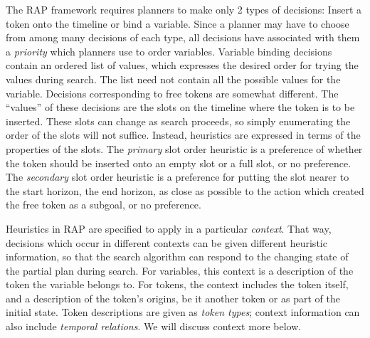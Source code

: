 The RAP framework requires planners to make only 2 types of decisions:
Insert a token onto the timeline or bind a variable.  Since a planner
may have to choose from among many decisions of each type, all
decisions have associated with them a {\em priority} which planners use
to order variables.  Variable binding decisions contain an ordered
list of values, which expresses the desired order for trying the
values during search.  The list need not contain all the possible
values for the variable.  Decisions corresponding to free tokens
are somewhat different.  The ``values'' of these decisions are the
slots on the timeline where the token is to be inserted.  These slots
can change as search proceeds, so simply enumerating the order of the
slots will not suffice.  Instead, heuristics are expressed in terms of the
properties of the slots.  The {\em primary} slot order heuristic is a
preference of whether the token should be inserted onto an empty slot
or a full slot, or no preference.  The {\em secondary} slot order heuristic
is a preference for putting the slot nearer to the start horizon, the end
horizon, as close as possible to the action which created the free token
as a subgoal, or no preference.  


Heuristics in RAP are specified to apply in a particular {\em
context}.  That way, decisions which occur in different contexts can
be given different heuristic information, so that the search algorithm
can respond to the changing state of the partial plan during search.
For variables, this context is a description of the token the variable
belongs to.  For tokens, the context includes the token itself, and a
description of the token's origins, be it another token or as part of
the initial state.  Token descriptions are given as {\em token types};
context information can also include {\em temporal relations}.  We
will discuss context more below.

